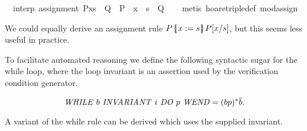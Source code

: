 \documentclass{llncs}
\newcommand{\llbrace}{\hspace{1pt} \lbrace \kern -3pt \vert \hspace{1pt}}
\newcommand{\rrbrace}{\hspace{0.5pt} \rbrace \kern -5pt \vert \hspace{3pt}}
\newcommand{\whileinv}[3]{\text{\textit{WHILE} $#1$ \textit{INVARIANT} $#2$ \textit{DO} $#3$ \textit{WEND}}}
\begin{document}
\begin{isabellebody}
\isanewline
{}\isamarkupfalse%
\ {}\ interp{}\ assignment{}\ {}P{}x{}s{}\ {}\ Q\ {}\ P\ {}\ x\ {}{}\ s\ {}\ Q{}\isanewline
%
\isadelimproof
\ \ %
\endisadelimproof
%
\isatagproof
{}\isamarkupfalse%
\ {}metis\ hoare{}triple{}def\ mod{}assign{}%
\endisatagproof
\end{isabellebody}

We could equally derive an assignment rule $P \llbrace x := s \rrbrace
P[x/s]$, but this seems less useful in practice.

To facilitate automated reasoning we define the following syntactic
sugar for the while loop, where the loop invariant is an assertion
used by the verification condition generator.

\begin{equation*}
\whileinv{b}{i}{p} = (bp)^\ast \overline{b}.
\end{equation*}

A variant of the while rule can be derived which uses the supplied
invariant.
\end{document}
